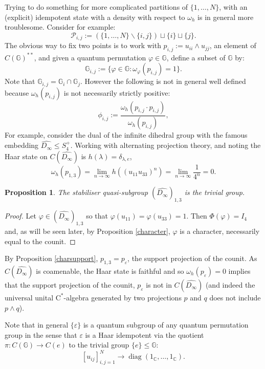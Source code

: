 \documentclass[12pt]{amsart}
\newtheorem{proposition}[theorem]{Proposition}
\theoremstyle{remark}
\theoremstyle{remark}
\begin{document}
Trying to do something for more complicated partitions of $\{1,\dots,N\}$, with an (explicit) idempotent state with a density with respect to $\omega_h$ is in general more troublesome. Consider for example:
$$\mathcal{P}_{i,j}:=(\{1,\dots,N\}\backslash\{i,j\})\sqcup\{i\}\sqcup\{j\}.$$
 The obvious way to fix two points is to work with $p_{i,j}:=u_{ii}\wedge u_{jj}$, an element of $ C(\mathbb{G})^{**}$, and given a quantum permutation $\varphi\in \mathbb{G}$, define a subset of $\mathbb{G}$ by:
$$\mathbb{G}_{i,j}:=\{\varphi\in \mathbb{G}:\omega_\varphi(p_{i,j})=1\}.$$
Note that $\mathbb{G}_{i,j}=\mathbb{G}_i\cap \mathbb{G}_j$. However the following is not in general well defined because  $\omega_h(p_{i,j})$ is not necessarily strictly positive:
$$\phi_{i,j}:=\frac{\omega_h(p_{i,j}\cdot p_{i,j})}{\omega_h(p_{i,j})},$$
For example, consider the dual of the infinite dihedral group with the famous embedding $\widehat{D_\infty}\leq S_4^+$.
Working with alternating projection theory, and noting the Haar state on $C(\widehat{D_\infty})$ is $h(\lambda)=\delta_{\lambda,e}$,
$$\omega_h(p_{1,3})=\lim_{n\rightarrow \infty}h ((u_{11}u_{33})^n)=\lim_{n\to \infty}\frac{1}{4^n}=0.$$
\begin{proposition}
The stabiliser quasi-subgroup $(\widehat{D_\infty})_{1,3}$ is the trivial group.
\end{proposition}
\begin{proof}
Let $\varphi\in(\widehat{D_{\infty}})_{1,3}$ so that $\varphi(u_{11})=\varphi(u_{33})=1$. Then $\Phi(\varphi)=I_4$ and, as will be seen later, by Proposition \ref{character}, $\varphi$ is a character, necessarily equal to the counit.
\end{proof}
By Proposition \ref{charsupport}, $p_{1,3}=p_{\varepsilon}$, the support projection of the counit. As $C(\widehat{D_\infty})$ is coamenable, the Haar state is faithful and so $\omega_h(p_{\varepsilon})=0$ implies that the support projection of the counit, $p_{\varepsilon}$ is not in $C(\widehat{D_\infty})$ (and indeed the universal unital $\mathrm{C}^*$-algebra generated by two projections $p$ and $q$ does not include $p\wedge q$).

\bigskip

 Note that in general $\{\varepsilon\}$ is a quantum subgroup of any quantum permutation group in the sense that $\varepsilon$ is a Haar idempotent via the quotient $\pi:C(\mathbb{G})\to C(e)$ to the trivial group $\{e\}\leq\mathbb{G}$:
$$[u_{ij}]_{i,j=1}^N\to \operatorname{diag}(1_{\mathbb{C}},\dots,1_{\mathbb{C}}).$$
\end{document}
